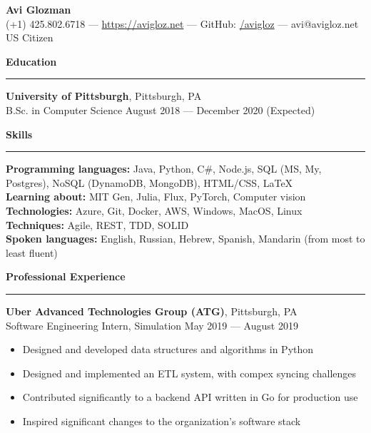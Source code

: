 \documentclass[11pt]{article}
\begin{document}
	\pagestyle{empty}
	\begin{center}
		{\LARGE \textbf{Avi Glozman}}\\
		\vspace{2mm}
		{\large (+1) 425.802.6718 --- \href{https://avigloz.net}{https://avigloz.net} --- GitHub: \href{https://github.com/avigloz}{/avigloz} --- avi@avigloz.net}\\
		\vspace{2mm}
		US Citizen
	\end{center}
	
        \begin{flushleft}

		\vspace{-1.75mm}
		{\large \raggedright \textbf{Education}}
		\vspace{1.5mm}
	
		\hrule
	
		\vspace{2.5mm}
		\textbf{University of Pittsburgh}, Pittsburgh, PA\\
		B.Sc. in Computer Science \hfill August 2018 --- December 2020 (Expected)
	
		\vspace{1.75mm}
		{\large \raggedright \textbf{Skills}}
		\vspace{1.5mm}
	
		\hrule
	
		\vspace{2.5mm}
		\textbf{Programming languages:} Java, Python, C\#, Node.js, SQL (MS, My, Postgres), NoSQL (DynamoDB, MongoDB), HTML/CSS, \LaTeX\\
		\textbf{Learning about:} MIT Gen, Julia, Flux, PyTorch, Computer vision\\
		\textbf{Technologies:} Azure, Git, Docker, AWS, Windows, MacOS, Linux\\
		\textbf{Techniques:} Agile, REST, TDD, SOLID\\
		\textbf{Spoken languages:} English, Russian, Hebrew, Spanish, Mandarin (from most to least fluent)
		
		\vspace{1.75mm}
		{\large \raggedright \textbf{Professional Experience}}
		\vspace{1.5mm}
	
		\hrule
	
		\vspace{2.5mm}
		\textbf{Uber Advanced Technologies Group (ATG)}, Pittsburgh, PA\\
		Software Engineering Intern, Simulation \hfill May 2019 --- August 2019
		\begin{itemize}
			\item Designed and developed data structures and algorithms in Python
			\item Designed and implemented an ETL system, with compex syncing challenges
			\item Contributed significantly to a backend API written in Go for production use
			\item Inspired significant changes to the organization's software stack
		\end{itemize}
	

\end{flushleft}
\end{document}
